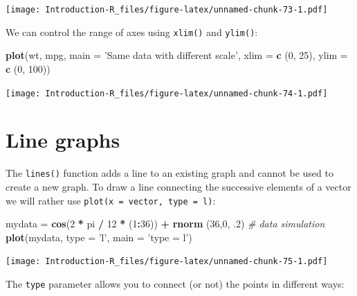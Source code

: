 \documentclass[]{book}
\newenvironment{Shaded}{\begin{snugshade}}{\end{snugshade}}
\newcommand{\CommentTok}[1]{\textcolor[rgb]{0.56,0.35,0.01}{\textit{#1}}}
\newcommand{\DataTypeTok}[1]{\textcolor[rgb]{0.13,0.29,0.53}{#1}}
\newcommand{\DecValTok}[1]{\textcolor[rgb]{0.00,0.00,0.81}{#1}}
\newcommand{\FloatTok}[1]{\textcolor[rgb]{0.00,0.00,0.81}{#1}}
\newcommand{\KeywordTok}[1]{\textcolor[rgb]{0.13,0.29,0.53}{\textbf{#1}}}
\newcommand{\NormalTok}[1]{#1}
\newcommand{\OperatorTok}[1]{\textcolor[rgb]{0.81,0.36,0.00}{\textbf{#1}}}
\newcommand{\StringTok}[1]{\textcolor[rgb]{0.31,0.60,0.02}{#1}}
\begin{document}
\texttt{[image: Introduction-R\_files/figure-latex/unnamed-chunk-73-1.pdf]}

We can control the range of axes using \texttt{xlim()} and \texttt{ylim()}:

\begin{Shaded}
\begin{Highlighting}[]
\KeywordTok{plot}\NormalTok{(wt, mpg, }\DataTypeTok{main =} \StringTok{'Same data with different scale'}\NormalTok{,}
     \DataTypeTok{xlim =} \KeywordTok{c}\NormalTok{ (}\DecValTok{0}\NormalTok{, }\DecValTok{25}\NormalTok{),}
     \DataTypeTok{ylim =} \KeywordTok{c}\NormalTok{ (}\DecValTok{0}\NormalTok{, }\DecValTok{100}\NormalTok{))}
\end{Highlighting}
\end{Shaded}

\texttt{[image: Introduction-R\_files/figure-latex/unnamed-chunk-74-1.pdf]}

\hypertarget{line-graphs}{%
\section{Line graphs}\label{line-graphs}}

The \texttt{lines()} function adds a line to an existing graph and cannot be used to create a new graph. To draw a line connecting the successive elements of a vector we will rather use \texttt{plot(x\ =\ vector,\ type\ =\ l)}:

\begin{Shaded}
\begin{Highlighting}[]
\NormalTok{mydata =}\StringTok{ }\KeywordTok{cos}\NormalTok{(}\DecValTok{2} \OperatorTok{*}\StringTok{ }\NormalTok{pi }\OperatorTok{/}\StringTok{ }\DecValTok{12} \OperatorTok{*}\StringTok{ }\NormalTok{(}\DecValTok{1}\OperatorTok{:}\DecValTok{36}\NormalTok{)) }\OperatorTok{+}\StringTok{ }\KeywordTok{rnorm}\NormalTok{ (}\DecValTok{36}\NormalTok{,}\DecValTok{0}\NormalTok{, }\FloatTok{.2}\NormalTok{) }\CommentTok{# data simulation}
\KeywordTok{plot}\NormalTok{(mydata, }\DataTypeTok{type =} \StringTok{'l'}\NormalTok{, }\DataTypeTok{main =} \StringTok{'type = l'}\NormalTok{)}
\end{Highlighting}
\end{Shaded}

\texttt{[image: Introduction-R\_files/figure-latex/unnamed-chunk-75-1.pdf]}

The \texttt{type} parameter allows you to connect (or not) the points in different ways:
\end{document}
